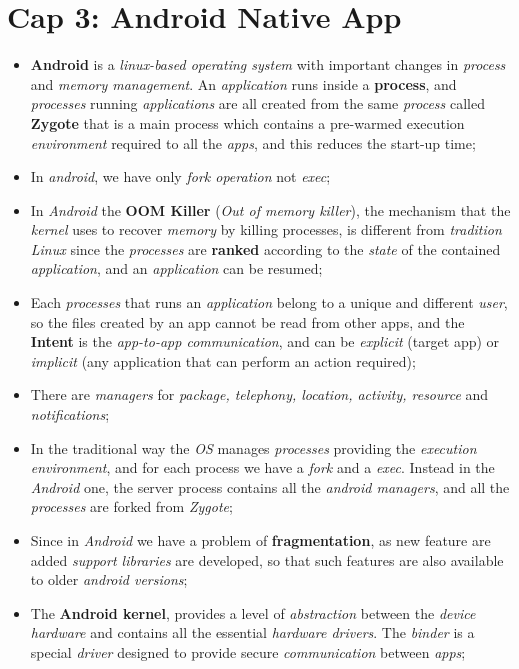 \documentclass{article}
\begin{document}
\section{Cap 3: Android Native App}
\begin{itemize}
\item \textbf{Android} is a \emph{linux-based operating system} with important changes in \emph{process} and \emph{memory management}. An \emph{application} runs inside a \textbf{process}, and \emph{processes} running \emph{applications} are all created from the same \emph{process} called \textbf{Zygote} that is a main process which contains a pre-warmed execution \emph{environment} required to all the \emph{apps}, and this reduces the start-up time;
\item In \emph{android}, we have only \emph{fork operation} not \emph{exec};
\item In \emph{Android} the \textbf{OOM Killer} (\emph{Out of memory killer}), the mechanism that the \emph{kernel} uses to recover \emph{memory} by killing processes, is different from \emph{tradition Linux} since the \emph{processes} are \textbf{ranked} according to the \emph{state} of the contained \emph{application}, and an \emph{application} can be resumed;
\item Each \emph{processes} that runs an \emph{application} belong to a unique and different \emph{user}, so the files created by an app cannot be read from other apps, and the \textbf{Intent} is the \emph{app-to-app communication}, and can be \emph{explicit} (target app) or \emph{implicit} (any application that can perform an action required); 
\item There are \emph{managers} for \emph{package, telephony, location, activity, resource} and \emph{notifications};
\item In the traditional way the \emph{OS} manages \emph{processes} providing the \emph{execution environment}, and for each process we have a \emph{fork} and a \emph{exec}. Instead in the \emph{Android} one, the server process contains all the \emph{android managers}, and all the \emph{processes} are forked from \emph{Zygote};
\item Since in \emph{Android} we have a problem of \textbf{fragmentation}, as new feature are added \emph{support libraries} are developed, so that such features are also available to older \emph{android versions};
\item The \textbf{Android kernel}, provides a level of \emph{abstraction} between the \emph{device hardware} and contains all the essential \emph{hardware drivers}. The \emph{binder} is a special \emph{driver} designed to provide secure \emph{communication} between \emph{apps};

\end{itemize}
\end{document}
